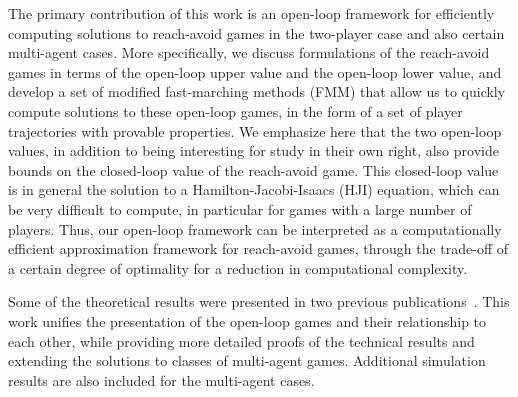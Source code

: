 The primary contribution of this work is an open-loop framework for efficiently computing solutions to reach-avoid games in the two-player case and also certain multi-agent cases.  More specifically, we discuss formulations of the reach-avoid games in terms of the open-loop upper value and the open-loop lower value, and develop a set of modified fast-marching methods (FMM) that allow us to quickly compute solutions to these open-loop games, in the form of a set of player trajectories with provable properties.  We emphasize here that the two open-loop values, in addition to being interesting for study in their own right, also provide bounds on the closed-loop value of the reach-avoid game.  This closed-loop value is in general the solution to a Hamilton-Jacobi-Isaacs (HJI) equation, which can be very difficult to compute, in particular for games with a large number of players.  Thus, our open-loop framework can be interpreted as a computationally efficient approximation framework for reach-avoid games, through the trade-off of a certain degree of optimality for a reduction in computational complexity.

Some of the theoretical results were presented in two previous publications~\cite{OL_ICRA2012, OL_CDC2012}.
This work unifies the presentation of the open-loop games and their relationship to each other, while providing more detailed proofs of the technical results and extending the solutions to classes of multi-agent games. Additional simulation results are also included for the multi-agent cases. 

